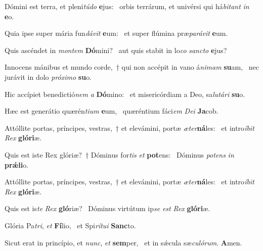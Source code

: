 \item Dómini est terra, et pleni\textit{túdo} \textbf{e}jus:~\psstar{} orbis terrárum, et univérsi qui há\textit{bitant} \textit{in} \textbf{e}o.
\item Quia ipse super mária fun\textit{dávit} \textbf{e}um:~\psstar{} et super flúmina præ\textit{parávit} \textbf{e}um.
\item Quis ascéndet in \textit{montem} \textbf{Dó}mini?~\psstar{} aut quis stabit in lo\textit{co} \textit{sancto} \textbf{e}jus?
\item Innocens mánibus et mundo corde,~† qui non accépit in vano á\textit{nimam} \textbf{su}am,~\psstar{} nec jurávit in dolo \textit{próximo} \textbf{su}o.
\item Hic accípiet benedictió\textit{nem} \textit{a} \textbf{Dó}mino:~\psstar{} et misericórdiam a Deo, sa\textit{lutári} \textbf{su}o.
\item Hæc est generátio quærén\textit{tium} \textbf{e}um,~\psstar{} quæréntium fáci\textit{em} \textit{Dei} \textbf{Ja}cob.
\item Attóllite portas, príncipes, vestras,~† et elevámini, portæ \textit{æter}\textbf{ná}les:~\psstar{} et intro\textit{íbit} \textit{Rex} \textbf{gló}\textbf{ri}æ.
\item Quis est iste Rex glóriæ?~† Dóminus for\textit{tis} \textit{et} \textbf{pot}ens:~\psstar{} Dóminus \textit{potens} \textit{in} \textbf{prǽ}\textbf{li}o.
\item Attóllite portas, príncipes, vestras,~† et elevámini, portæ \textit{æter}\textbf{ná}les:~\psstar{} et intro\textit{íbit} \textit{Rex} \textbf{gló}\textbf{ri}æ.
\item Quis est is\textit{te} \textit{Rex} \textbf{gló}riæ?~\psstar{} Dóminus virtútum ip\textit{se} \textit{est} \textit{Rex} \textbf{gló}\textbf{ri}æ.
\item Glória Pa\textit{tri}, \textit{et} \textbf{Fí}lio,~\psstar{} et Spi\textit{rítui} \textbf{Sanc}to.
\item Sicut erat in princípio, et \textit{nunc}, \textit{et} \textbf{sem}per,~\psstar{} et in sǽcula sæ\textit{culórum}. \textbf{A}men.
